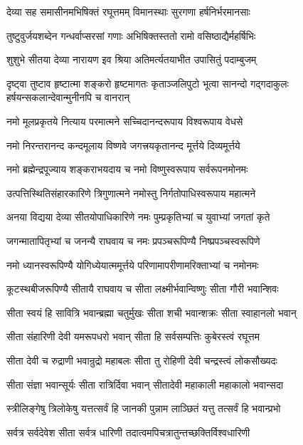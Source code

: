 \twolineshloka
{देव्या सह समासीनमभिषिक्तं रघूत्तमम्}
{विमानस्थाः सुरगणा हर्षनिर्भरमानसाः}%

\twolineshloka
{तुष्टुवुर्जयशब्देन गन्धर्वाप्सरसां गणाः}
{अभिषिक्तस्ततो रामो वसिष्ठाद्यैर्महर्षिभिः}%

\twolineshloka
{शुशुभे सीतया देव्या नारायण इव श्रिया}
{अतिमर्त्यतयाभीत उपासितुं पदाम्बुजम्}%

\threelineshloka
{दृष्ट्वा तुष्टाव हृष्टात्मा शङ्करो हृष्टमागतः}
{कृताञ्जलिपुटो भूत्वा सानन्दो गद्गदाकुलः}
{हर्षयन्सकलान्देवान्मुनीनपि च वानरान्}%


\twolineshloka
{नमो मूलप्रकृतये नित्याय परमात्मने}
{सच्चिदानन्दरूपाय विश्वरूपाय वेधसे}%

\twolineshloka
{नमो निरन्तरानन्द कन्दमूलाय विष्णवे}
{जगत्त्रयकृतानन्द मूर्त्तये दिव्यमूर्त्तये}%

\twolineshloka
{नमो ब्रह्मेन्द्रपूज्याय शङ्कराभयदाय च}
{नमो विष्णुस्वरूपाय सर्वरूपनमोनमः}%

\twolineshloka
{उत्पत्तिस्थितिसंहारकारिणे त्रिगुणात्मने}
{नमोस्तु निर्गतोपाधिस्वरूपाय महात्मने}%

\twolineshloka
{अनया विद्यया देव्या सीतयोपाधिकारिणे}
{नमः पुम्प्रकृतिभ्यां च युवाभ्यां जगतां कृते}%

\twolineshloka
{जगन्मातापितृभ्यां च जनन्यै राघवाय च}
{नमः प्रपञ्चरूपिण्यै निष्प्रपञ्चस्वरूपिणे}%

\twolineshloka
{नमो ध्यानस्वरूपिण्यै योगिध्येयात्ममूर्त्तये}
{परिणामापरीणामरिक्ताभ्यां च नमोनमः}%

\twolineshloka
{कूटस्थबीजरूपिण्यै सीतायै राघवाय च}
{सीता लक्ष्मीर्भवान्विष्णुः सीता गौरी भवान्शिवः}%

\twolineshloka
{सीता स्वयं हि सावित्रि भवान्ब्रह्मा चतुर्मुखः}
{सीता शची भवान्शक्रः सीता स्वाहानलो भवान्}%

\twolineshloka
{सीता संहारिणी देवी यमरूपधरो भवान्}
{सीता हि सर्वसम्पत्तिः कुबेरस्त्वं रघूत्तम}%

\twolineshloka
{सीता देवी च रुद्राणी भवान्रुद्रो महाबलः}
{सीता तु रोहिणी देवी चन्द्रस्त्वं लोकसौख्यदः}%

\twolineshloka
{सीता संज्ञा भवान्सूर्यः सीता रात्रिर्दिवा भवान्}
{सीतादेवी महाकाली महाकालो भवान्सदा}%

\twolineshloka
{स्त्रीलिङ्गेषु त्रिलोकेषु यत्तत्सर्वं हि जानकी}
{पुन्नाम लाञ्छितं यत्तु तत्सर्वं हि भवान्प्रभो}%

\twolineshloka
{सर्वत्र सर्वदेवेश सीता सर्वत्र धारिणी}
{तदात्वमपिचत्रातुन्तच्छक्तिर्विश्वधारिणी}%

